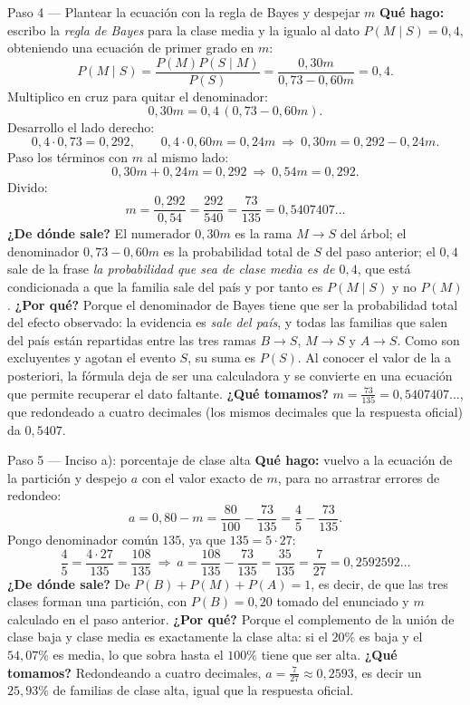 \documentclass[11pt]{article}
\begin{document}
\begin{sol}
\begin{paso}{Paso 4 --- Plantear la ecuación con la regla de Bayes y despejar $m$}
\textbf{Qué hago:} escribo la \emph{regla de Bayes} para la clase media y la igualo al dato $P(M\mid S)=0,4$, obteniendo una ecuación de primer grado en $m$:
\[
P(M\mid S)=\frac{P(M)P(S\mid M)}{P(S)}=\frac{0,30m}{0,73-0,60m}=0,4 .
\]
Multiplico en cruz para quitar el denominador:
\[
0,30m=0,4\,(0,73-0,60m).
\]
Desarrollo el lado derecho:
\[
0,4\cdot 0,73=0,292,\qquad 0,4\cdot 0,60m=0,24m\ \Longrightarrow\ 0,30m=0,292-0,24m .
\]
Paso los términos con $m$ al mismo lado:
\[
0,30m+0,24m=0,292\ \Longrightarrow\ 0,54m=0,292 .
\]
Divido:
\[
m=\frac{0,292}{0,54}=\frac{292}{540}=\frac{73}{135}=0,5407407\ldots
\]
\textbf{¿De dónde sale?} El numerador $0,30m$ es la rama $M\to S$ del árbol; el denominador $0,73-0,60m$ es la probabilidad total de $S$ del paso anterior; el $0,4$ sale de la frase \emph{la probabilidad que sea de clase media es de $0,4$}, que está condicionada a que la familia sale del país y por tanto es $P(M\mid S)$ y no $P(M)$.
\textbf{¿Por qué?} Porque el denominador de Bayes tiene que ser la probabilidad total del efecto observado: la evidencia es \emph{sale del país}, y todas las familias que salen del país están repartidas entre las tres ramas $B\to S$, $M\to S$ y $A\to S$. Como son excluyentes y agotan el evento $S$, su suma es $P(S)$. Al conocer el valor de la a posteriori, la fórmula deja de ser una calculadora y se convierte en una ecuación que permite recuperar el dato faltante.
\textbf{¿Qué tomamos?} $m=\tfrac{73}{135}=0,5407407\ldots$, que redondeado a cuatro decimales (los mismos decimales que la respuesta oficial) da $0,5407$.
\end{paso}

\begin{paso}{Paso 5 --- Inciso a): porcentaje de clase alta}
\textbf{Qué hago:} vuelvo a la ecuación de la partición y despejo $a$ con el valor exacto de $m$, para no arrastrar errores de redondeo:
\[
a=0,80-m=\frac{80}{100}-\frac{73}{135}=\frac{4}{5}-\frac{73}{135}.
\]
Pongo denominador común $135$, ya que $135=5\cdot 27$:
\[
\frac45=\frac{4\cdot 27}{135}=\frac{108}{135}\ \Longrightarrow\ a=\frac{108}{135}-\frac{73}{135}=\frac{35}{135}=\frac{7}{27}=0,2592592\ldots
\]
\textbf{¿De dónde sale?} De $P(B)+P(M)+P(A)=1$, es decir, de que las tres clases forman una partición, con $P(B)=0,20$ tomado del enunciado y $m$ calculado en el paso anterior.
\textbf{¿Por qué?} Porque el complemento de la unión de clase baja y clase media es exactamente la clase alta: si el $20\%$ es baja y el $54,07\%$ es media, lo que sobra hasta el $100\%$ tiene que ser alta.
\textbf{¿Qué tomamos?} Redondeando a cuatro decimales, $a=\tfrac{7}{27}\approx 0,2593$, es decir un $25,93\%$ de familias de clase alta, igual que la respuesta oficial.
\end{paso}


\end{sol}
\end{document}
